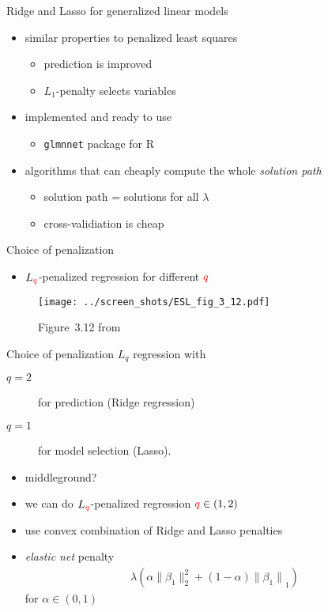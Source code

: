 \documentclass[xcolor=dvipsnames, handout]{beamer}
\begin{document}
\begin{frame}{Ridge and Lasso for generalized linear models}

\begin{itemize}[<+->]
  \item similar properties to penalized least squares 
  \begin{itemize}
    \item prediction is improved 
    \item $L_1$-penalty selects variables
  \end{itemize}
  \item implemented and ready to use 
  \begin{itemize}
    \item \texttt{glmnnet} package for R
  \end{itemize}
  \item algorithms that can cheaply compute the whole \emph{solution path}
  \begin{itemize}
    \item solution path = solutions for all $\lambda$
    \item cross-validiation is cheap
  \end{itemize}
\end{itemize}
\end{frame}


\begin{frame}{Choice of penalization}
\begin{itemize}
  \item $L_{\textcolor{red}{q}}$-penalized regression for different $\textcolor{red}{q}$
\end{itemize}
\begin{figure}
  \texttt{[image: ../screen\_shots/ESL\_fig\_3\_12.pdf]}
   \caption{Figure~3.12 from \textcite{hastie2009elements}}
\end{figure}
\end{frame}


\begin{frame}{Choice of penalization}
$L_q$ regression with
\begin{description}
  \item[$q = 2$] for prediction (Ridge regression)
  \item[$q = 1$] for model selection (Lasso). 
\end{description}
\begin{itemize}[<+->]
  \item middleground?
  \item we can do $L_{\textcolor{red}{q}}$-penalized regression $\textcolor{red}{q} \in (1, 2)$
  \item use convex combination of Ridge and Lasso penalties
  \item \emph{elastic net} penalty 
  \begin{align*}
    \lambda \left(\alpha \lVert{\beta_1}\rVert_2^2 + (1 - \alpha) \lVert{\beta_1\rVert}_1\right)
  \end{align*}
  for $\alpha \in (0, 1)$
\end{itemize}
\end{frame}
\end{document}
